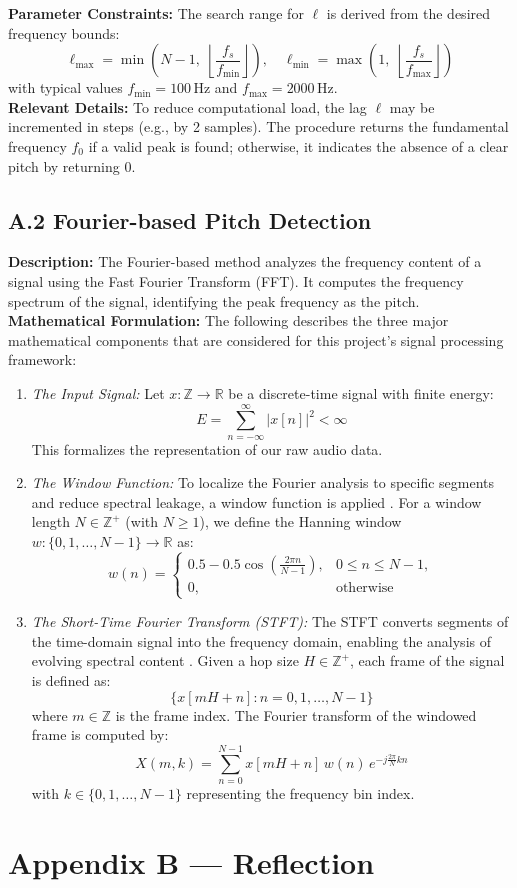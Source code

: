 \documentclass[12pt]{article}
\begin{document}
\textbf{Parameter Constraints:}  
The search range for \(\ell\) is derived from the desired frequency bounds:
\[\ell_{\max} = \min\left( N-1,\; \left\lfloor \frac{f_s}{f_{\min}} \right\rfloor \right), \quad
\ell_{\min} = \max\left( 1,\; \left\lfloor \frac{f_s}{f_{\max}} \right\rfloor \right)\]
with typical values \( f_{\min} = 100\,\text{Hz} \) and \( f_{\max} = 2000\,\text{Hz} \).\\
\newline
\textbf{Relevant Details:}  
To reduce computational load, the lag \( \ell \) may be incremented in steps (e.g., by 2 samples). The procedure returns the fundamental frequency \( f_0 \) if a valid peak is found; otherwise, it indicates the absence of a clear pitch by returning 0.

\subsection*{A.2 Fourier-based Pitch Detection}
\textbf{Description:} The Fourier-based method analyzes the frequency content of a signal using the Fast Fourier Transform (FFT).
It computes the frequency spectrum of the signal, identifying the peak frequency as the pitch.\\
\newline
\textbf{Mathematical Formulation:} The following describes the three major mathematical components that are considered for this project's signal processing framework:
\begin{enumerate}
  \item \textit{The Input Signal:}  
  Let \( x: \mathbb{Z} \to \mathbb{R} \) be a discrete-time signal with finite energy:
  \[E = \sum_{n=-\infty}^{\infty} |x[n]|^2 < \infty\]
  This formalizes the representation of our raw audio data.

  \item \textit{The Window Function:}  
  To localize the Fourier analysis to specific segments and reduce spectral leakage, a window function is applied \cite{windows-harmonic-analysis}. For a window length \( N \in \mathbb{Z}^+ \) (with \( N \geq 1 \)), we define the Hanning window \( w: \{0, 1, \dots, N-1\} \to \mathbb{R} \) as:
  \[
  w(n) = 
  \begin{cases}
  0.5 - 0.5\cos\left(\frac{2\pi n}{N-1}\right), & 0 \leq n \leq N-1, \\
  0, & \text{otherwise}
  \end{cases}
  \]

  \item \textit{The Short-Time Fourier Transform (STFT):}  
  The STFT converts segments of the time-domain signal into the frequency domain, enabling the analysis of evolving spectral content \cite{onset-detection, ZhouRiess}. Given a hop size \( H \in \mathbb{Z}^+ \), each frame of the signal is defined as:
  \[\{ x[mH+n] : n = 0, 1, \dots, N-1 \}\]
  where \( m \in \mathbb{Z} \) is the frame index. The Fourier transform of the windowed frame is computed by:
  \[X(m,k) = \sum_{n=0}^{N-1} x[mH+n]\,w(n)\, e^{-j\frac{2\pi}{N}kn}\]
  with \( k \in \{0, 1, \dots, N-1\} \) representing the frequency bin index.
\end{enumerate}
\newpage{}
\section*{Appendix B --- Reflection}




\end{document}
